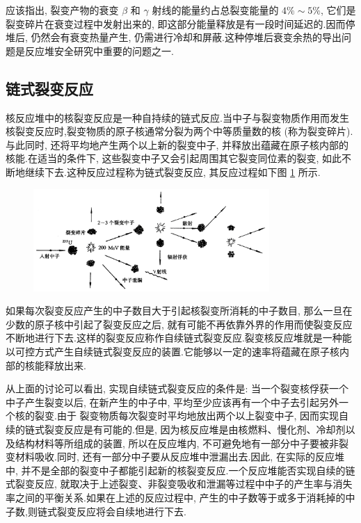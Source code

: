 \documentclass{Sichuan Normal University}
\begin{document}
应该指出, 裂变产物的衰变 $\beta$ 和 $\gamma$ 射线的能量约占总裂变能量的 $4 \% \sim 5 \%$, 它们是裂变碎片在衰变过程中发射出来的, 即这部分能量释放是有一段时间延迟的.因而停堆后, 仍然会有衰变热量产生, 仍需进行冷却和屏蔽.这种停堆后衰变余热的导出问题是反应堆安全研究中重要的问题之一.

\subsection{链式裂变反应}

核反应堆中的核裂变反应是一种自持续的链式反应.当中子与裂变物质作用而发生核裂变反应时,裂变物质的原子核通常分裂为两个中等质量数的核 (称为裂变碎片).与此同时, 还将平均地产生两个以上新的裂变中子, 并释放出蕴藏在原子核内部的核能.在适当的条件下, 这些裂变中子又会引起周围其它裂变同位素的裂变, 如此不断地继续下去.这种反应过程称为链式裂变反应, 其反应过程如下图 \ref{fig:链式裂变反应} 所示.
\begin{figure}[H]
    \centering
    \includegraphics[width=0.8\textwidth]{./figure/链式裂变反应示意图.png}
    \label{fig:链式裂变反应}
    \end{figure}
如果每次裂变反应产生的中子数目大于引起核裂变所消耗的中子数目, 那么一旦在少数的原子核中引起了裂变反应之后, 就有可能不再依靠外界的作用而使裂变反应不断地进行下去.这样的裂变反应称作自续链式裂变反应.裂变核反应堆就是一种能以可控方式产生自续链式裂变反应的装置.它能够以一定的速率将蕴藏在原子核内部的核能释放出来.

从上面的讨论可以看出, 实现自续链式裂变反应的条件是: 当一个裂变核俘获一个中子产生裂变以后, 在新产生的中子中, 平均至少应该再有一个中子去引起另外一个核的裂变.由于
裂变物质每次裂变时平均地放出两个以上裂变中子, 因而实现自续的链式裂变反应是有可能的.但是, 因为核反应堆是由核燃料、慢化剂、冷却剂以及结构材料等所组成的装置, 所以在反应堆内, 不可避免地有一部分中子要被非裂变材料吸收.同时, 还有一部分中子要从反应堆中泄漏出去.因此, 在实际的反应堆中, 并不是全部的裂变中子都能引起新的核裂变反应.一个反应堆能否实现自续的链式裂变反应, 就取决于上述裂变、非裂变吸收和泄漏等过程中中子的产生率与消失率之间的平衡关系.如果在上述的反应过程中, 产生的中子数等于或多于消耗掉的中子数,则链式裂变反应将会自续地进行下去.
\end{document}
